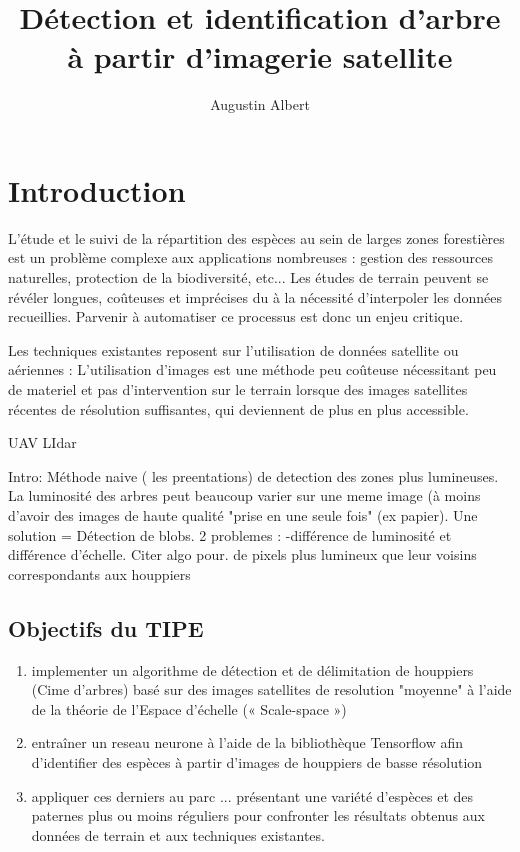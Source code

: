 \documentclass{article}
\title{Détection et identification d'arbre à partir d'imagerie satellite}
\author{Augustin Albert}
\begin{document}
\maketitle
\tableofcontents

\section*{Introduction}

L'étude et le suivi de la répartition des espèces au sein de larges zones forestières est un problème complexe aux applications nombreuses :
gestion des ressources naturelles, protection de la biodiversité, etc... Les études de terrain peuvent se révéler longues, coûteuses et imprécises du à la nécessité d'interpoler les données recueillies. 
Parvenir à automatiser ce processus est donc un enjeu critique. 

Les techniques existantes reposent sur l'utilisation de données satellite ou aériennes : L'utilisation d'images est une méthode peu coûteuse nécessitant peu de materiel et pas d'intervention sur le terrain lorsque 
des images satellites récentes de résolution suffisantes, qui deviennent de plus en plus accessible.  

UAV LIdar

Intro: Méthode naive ( les preentations) de detection des zones plus lumineuses. La luminosité des arbres peut beaucoup varier sur une meme image (à moins d'avoir des images de haute qualité "prise en une seule fois" (ex papier). Une solution = Détection de blobs. 2 problemes : -différence de luminosité et différence d'échelle. Citer algo pour. de pixels plus lumineux que leur voisins correspondants aux houppiers


\subsection*{Objectifs du TIPE}		
\begin{enumerate}
	\item implementer un algorithme de détection et de délimitation de houppiers (Cime d'arbres) basé sur des images satellites de resolution "moyenne" à l'aide de la théorie de l'Espace d'échelle (« Scale-space ») 
	\item entraîner un reseau neurone à l'aide de la bibliothèque Tensorflow afin d'identifier des espèces à partir d'images de houppiers de basse résolution 
	\item appliquer ces derniers au parc ... présentant une variété d'espèces et des paternes plus ou moins réguliers pour confronter les résultats obtenus aux données de terrain et aux techniques existantes.    
\end{enumerate}
	
\end{document}
